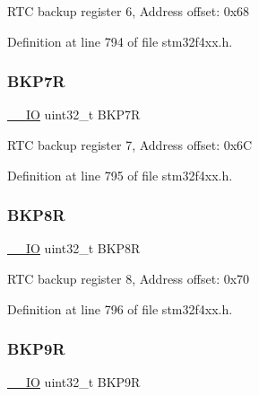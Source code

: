R\+TC backup register 6, Address offset\+: 0x68 

Definition at line 794 of file stm32f4xx.\+h.

\mbox{\label{struct_r_t_c___type_def_a2ca54ce1a8d2fa9d1ba6d5987ed5e2cf}} 
\subsubsection{\texorpdfstring{B\+K\+P7R}{BKP7R}}
{\footnotesize\ttfamily \hyperlink{group___c_m_s_i_s__core__definitions_gaec43007d9998a0a0e01faede4133d6be}{\+\_\+\+\_\+\+IO} uint32\+\_\+t B\+K\+P7R}

R\+TC backup register 7, Address offset\+: 0x6C 

Definition at line 795 of file stm32f4xx.\+h.

\mbox{\label{struct_r_t_c___type_def_ac1085f6aae54b353c30871fe90c59851}} 
\subsubsection{\texorpdfstring{B\+K\+P8R}{BKP8R}}
{\footnotesize\ttfamily \hyperlink{group___c_m_s_i_s__core__definitions_gaec43007d9998a0a0e01faede4133d6be}{\+\_\+\+\_\+\+IO} uint32\+\_\+t B\+K\+P8R}

R\+TC backup register 8, Address offset\+: 0x70 

Definition at line 796 of file stm32f4xx.\+h.

\mbox{\label{struct_r_t_c___type_def_a6c33564df6eaf97400e0457dde9b14ef}} 
\subsubsection{\texorpdfstring{B\+K\+P9R}{BKP9R}}
{\footnotesize\ttfamily \hyperlink{group___c_m_s_i_s__core__definitions_gaec43007d9998a0a0e01faede4133d6be}{\+\_\+\+\_\+\+IO} uint32\+\_\+t B\+K\+P9R}

